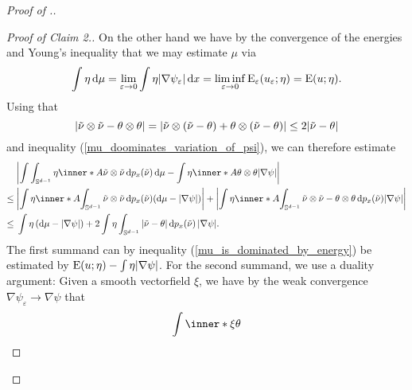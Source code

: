 \begin{proof}[Proof of .]
\begin{proof}[Proof of Claim 2.]
		On the other hand we have by the convergence of the energies and 
		Young's inequality that we 
		may estimate $ \mu $ via 
		\begin{equation}
			\label{mu_is_dominated_by_energy}
			\int
			\eta
			\dd{ \mu }
			=
			\lim_{ \varepsilon \to 0 }
			\int
			\eta
			\abs{ \nabla \psi_{ \varepsilon } }
			\dd{ x }
			=
			\liminf_{ \varepsilon \to 0 }
			\operatorname{E}_{ \varepsilon } ( u_{ \varepsilon } ; \eta )
			=
			\operatorname{E} ( u ; \eta ).
		\end{equation}
		Using that
		\begin{equation*} 
			\abs{ \tilde{ \nu } \otimes \tilde{ \nu } - \theta \otimes \theta } 
			= 
			\abs{ 
				\tilde{ \nu } \otimes ( \tilde{ \nu } - \theta ) 
				+
				\theta \otimes ( \tilde{ \nu } - \theta ) 
			}
			\leq
			2 \abs{ \tilde{ \nu } - \theta }
		\end{equation*}
		and inequality (\ref{mu_doominates_variation_of_psi}), we can therefore 
		estimate
		\begin{align*}
			&
			\abs{ 
				\int
				\int_{ \mathbb{ S }^{ d - 1 } }
				\eta
				\inner*{ A }{ \tilde{ \nu } \otimes \tilde{ \nu } }
				\dd{ p_{ x } ( \tilde{ \nu } ) }
				\dd{ \mu }
				-
				\int
				\eta
				\inner*{ A }{ \theta \otimes \theta }
				\abs{ \nabla \psi }
			}
			\\
			\leq{} &
			\abs{ 
				\int
				\eta 
				\inner*{ A }
				{ 
					\int_{ \mathbb{ S }^{ d - 1 } }
					\tilde{ \nu } \otimes \tilde{ \nu }
					\dd{ p_{ x } ( \tilde{ \nu } ) }
				}
				( \dd{ \mu } - \abs{ \nabla \psi } )
			}
			+
			\abs{
				\int
				\eta
				\inner*{ A }{
					\int_{ \mathbb{ S }^{ d - 1 } }
					\tilde{ \nu } \otimes \tilde{ \nu }
					-
					\theta \otimes \theta
					\dd{ p_{ x } ( \tilde{ \nu } ) }
				}
				\abs{ \nabla \psi }
			}
			\\
			\leq {} &
			\int
			\eta
			\left( \dd{ \mu } - \abs{ \nabla \psi } \right)
			+
			2
			\int
			\eta
			\int_{ \mathbb{ S }^{ d - 1 } }
			\abs{ \tilde{ \nu } - \theta } 
			\dd{ p_{ x } ( \tilde{ \nu } ) }
			\abs{ \nabla \psi }.
		\end{align*}
		The first summand can by inequality (\ref{mu_is_dominated_by_energy}) 
		be estimated by 
		$ \operatorname{E} ( u ; \eta ) - \int \eta \abs{ \nabla \psi } $.
		For the second summand, we use a duality argument:
		Given a smooth vectorfield $ \xi $, we have by the weak convergence $ 
		\nabla \psi_{ \varepsilon } \to \nabla \psi $ that
		\begin{equation*}
			\int
			\inner*{ \xi }{ \theta }

\end{equation*}
\end{proof}
\end{proof}
